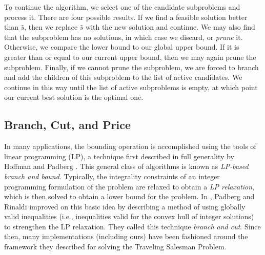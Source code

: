 To continue the algorithm, we select one of the candidate subproblems
and process it. There are four possible results. If we find a feasible
solution better than $\hat{s}$, then we replace $\hat{s}$ with the new
solution and continue. We may also find that the subproblem has no
solutions, in which case we discard, or {\em prune} it. Otherwise, we
compare the lower bound to our global upper bound. If it is greater
than or equal to our current upper bound, then we may again prune the
subproblem. Finally, if we cannot prune the subproblem, we are forced
to branch and add the children of this subproblem to the list of
active candidates. We continue in this way until the list of active
subproblems is empty, at which point our current best solution is the
optimal one.

\subsection{Branch, Cut, and Price}
\label{branchandcut}

In many applications, the bounding operation is accomplished using the
tools of linear programming (LP), a technique first described in full
generality by Hoffman and Padberg \cite{hoff:LP}. This general class of
algorithms is known as {\em LP-based branch and bound}. Typically, the
integrality constraints of an integer programming formulation of the
problem are relaxed to obtain a {\em LP relaxation}, which is then
solved to obtain a lower bound for the problem. In \cite{padb:branc},
Padberg and Rinaldi improved on this basic idea by describing a method
of using globally valid inequalities (i.e., inequalities valid for the
convex hull of integer solutions) to strengthen the LP relaxation.
They called this technique {\em branch and cut}. Since then, many
implementations (including ours) have been fashioned around the
framework they described for solving the Traveling Salesman Problem.

